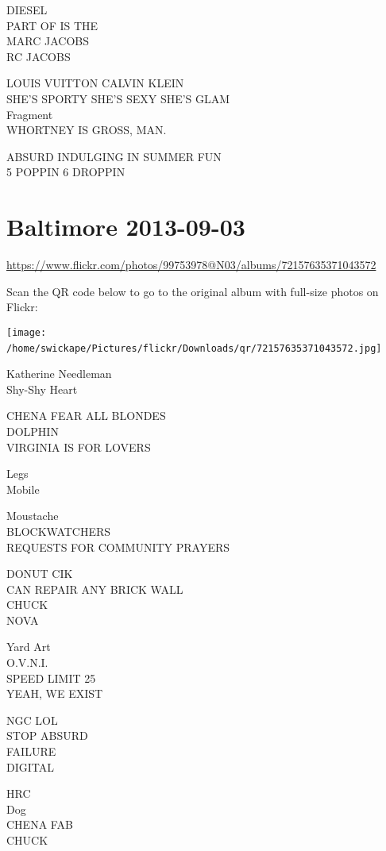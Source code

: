 \documentclass[10pt,letterpaper]{article}
\begin{document}
DIESEL\\
PART OF IS THE\\
MARC JACOBS\\
RC JACOBS

LOUIS VUITTON CALVIN KLEIN\\
SHE'S SPORTY SHE'S SEXY SHE'S GLAM\\
Fragment\\
WHORTNEY IS GROSS, MAN.

ABSURD INDULGING IN SUMMER FUN\\
5 POPPIN 6 DROPPIN
\

\section*{Baltimore 2013-09-03}

\url{https://www.flickr.com/photos/99753978@N03/albums/72157635371043572}

Scan the QR code below to go to the original album with full-size photos on Flickr:

\texttt{[image: /home/swickape/Pictures/flickr/Downloads/qr/72157635371043572.jpg]}
\

Katherine Needleman\\
Shy{-}Shy Heart

CHENA FEAR ALL BLONDES\\
DOLPHIN\\
VIRGINIA IS FOR LOVERS

Legs\\
Mobile

Moustache\\
BLOCKWATCHERS\\
REQUESTS FOR COMMUNITY PRAYERS

DONUT CIK\\
CAN REPAIR ANY BRICK WALL\\
CHUCK\\
NOVA

Yard Art\\
O.V.N.I.\\
SPEED LIMIT 25\\
YEAH, WE EXIST

NGC LOL\\
STOP ABSURD\\
FAILURE\\
DIGITAL

HRC\\
Dog\\
CHENA FAB\\
CHUCK
\end{document}
